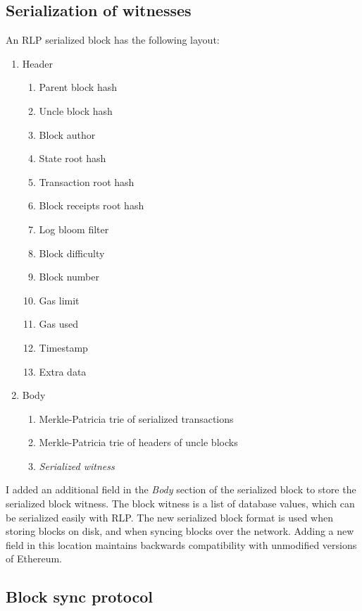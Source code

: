 \documentclass[12pt]{article}
\newcounter{protocol}
\begin{document}
\subsection{Serialization of witnesses}
An RLP serialized block has the following layout:
\begin{enumerate}
  \item Header
  \begin{enumerate}
    \item Parent block hash
    \item Uncle block hash
    \item Block author
    \item State root hash
    \item Transaction root hash
    \item Block receipts root hash
    \item Log bloom filter
    \item Block difficulty
    \item Block number
    \item Gas limit
    \item Gas used
    \item Timestamp
    \item Extra data
  \end{enumerate}
  \item Body
  \begin{enumerate}
    \item Merkle-Patricia trie of serialized transactions
    \item Merkle-Patricia trie of headers of uncle blocks
    \item \emph{Serialized witness}
  \end{enumerate}
\end{enumerate}

I added an additional field in the \emph{Body} section of the serialized block to store the serialized block witness. The block witness is a list of database values, which can be serialized easily with RLP. The new serialized block format is used when storing blocks on disk, and when syncing blocks over the network. Adding a new field in this location maintains backwards compatibility with unmodified versions of Ethereum.

\subsection{Block sync protocol}
\end{document}
